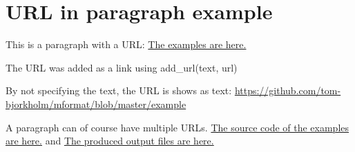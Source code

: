 \documentclass[a4paper]{report}
\begin{document}
\chapter{URL in paragraph example}

This is a paragraph with a URL: \href{https://github.com/tom-bjorkholm/mformat/blob/master/example}{The examples are here.}

The URL was added as a link using add\_url(text, url)

By not specifying the text, the URL is shows as text: \url{https://github.com/tom-bjorkholm/mformat/blob/master/example}

A paragraph can of course have multiple URLs. \href{https://github.com/tom-bjorkholm/mformat/blob/master/example/src}{The source code of the examples are here.} and \href{https://github.com/tom-bjorkholm/mformat/blob/master/example/result}{The produced output files are here.}
\end{document}
